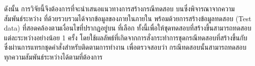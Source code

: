 ดังนั้น การวิจัยนี้จึงต้องการที่จะนำเสนอแนวทางการสร้างกรณีทดสอบ บน{\TestPath}ซึ่งพิจารณาจากความสัมพันธ์ระหว่าง{\softwareComponent} 
ที่ด้วยรวบรวมได้จากข้อมูล{\StaticInformation}ของ{\sourcode}ภายใน{\Package}ภายใน{\SUT} พร้อมด้วยการสร้างข้อมูลทดสอบ (Test data) 
ที่สอดคล้องตามเงื่อนไขที่ปรากฏอยู่บน{\TestPath} ที่เลือก ทั้งนี้เพื่อให้ชุดทดสอบที่สร้างขึ้นสามารถทดสอบแต่ละ{\Path}ระหว่าง{\softwareComponent}อย่างน้อย 1 ครั้ง
โดยใช้ผลลัพธ์ที่เกิดจากการสั่งกระทำการชุดกรณีทดสอบที่สร้างขึ้นกับ{\sourcecode}ซึ่งผ่านการแทรกชุดคำสั่งสำหรับติดตามการทำงาน 
เพื่อตรวจสอบว่า กรณีทดสอบนั้นสามารถทดสอบทุกความสัมพันธ์ระหว่าง{\softwareComponent}ได้ตามที่ต้องการ
